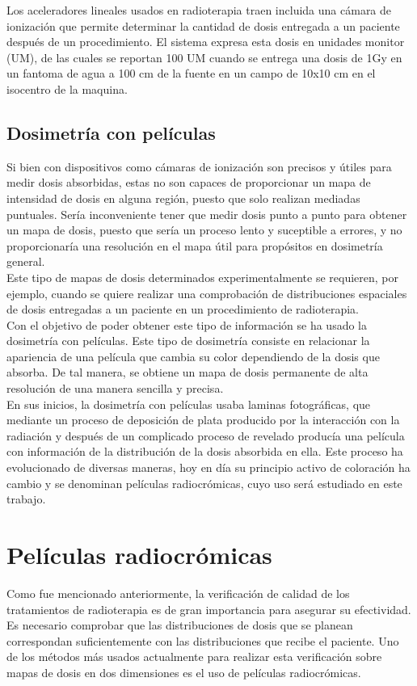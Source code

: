 Los aceleradores lineales usados en radioterapia traen incluida una cámara de ionización que permite determinar la cantidad de dosis entregada a un paciente después de un procedimiento. El sistema expresa esta dosis en unidades monitor (UM), de las cuales se reportan 100 UM cuando se entrega una dosis de 1Gy en un fantoma de agua a 100 cm de la fuente en un campo de 10x10 cm en el isocentro de la maquina.

\subsection{Dosimetría con películas}
Si bien con dispositivos como cámaras de ionización son precisos y útiles para medir dosis absorbidas, estas no son capaces de proporcionar un mapa de intensidad de dosis en alguna región, puesto que solo realizan mediadas puntuales. Sería inconveniente tener que medir dosis punto a punto para obtener un mapa de dosis, puesto que sería un proceso lento y suceptible a errores, y no proporcionaría una resolución en el mapa útil para propósitos en dosimetría general. \\

Este tipo de mapas de dosis determinados experimentalmente se requieren, por ejemplo, cuando se quiere realizar una comprobación de distribuciones espaciales de dosis entregadas a un paciente en un procedimiento de radioterapia.\\

Con el objetivo de poder obtener este tipo de información se ha usado la dosimetría con películas. Este tipo de dosimetría consiste en relacionar la apariencia de una película que cambia su color dependiendo de la dosis que absorba. De tal manera, se obtiene un mapa de dosis permanente de alta resolución de una manera sencilla y precisa.\\

En sus inicios, la dosimetría con películas usaba laminas fotográficas, que mediante un proceso de deposición de plata producido por la interacción con la radiación y después de un complicado proceso de revelado producía una película con información de la distribución de la dosis absorbida en ella. Este proceso ha evolucionado de diversas maneras, hoy en día su principio activo de coloración ha cambio y se denominan películas radiocrómicas, cuyo uso será estudiado en este trabajo.\\

 
\section{Películas radiocrómicas}
Como fue mencionado anteriormente, la verificación de calidad de los tratamientos de radioterapia es de gran importancia para asegurar su efectividad. Es necesario comprobar que las distribuciones de dosis que se planean correspondan suficientemente con las distribuciones que recibe el paciente. Uno de los métodos más usados actualmente para realizar esta verificación sobre mapas de dosis en dos dimensiones es el uso de películas radiocrómicas.\\

